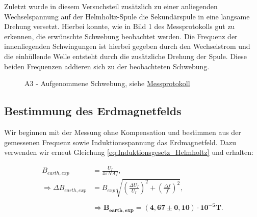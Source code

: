 \documentclass{article}
\begin{document}
Zuletzt wurde in diesem Versuchsteil zusätzlich zu einer anliegenden Wechselspannung auf der Helmholtz-Spule die Sekundärspule in eine langsame Drehung versetzt. Hierbei konnte, wie in Bild 1 des Messprotokolls gut zu erkennen, die erwünschte Schwebung beobachtet werden. Die Frequenz der innenliegenden Schwingungen ist hierbei gegeben durch den Wechselstrom und die einhüllende Welle entsteht durch die zusätzliche Drehung der Spule. Diese beiden Frequenzen addieren sich zu der beobachteten Schwebung.

\phantom{.}

\begin{figure}[!h]
    \centering
    \caption{A3 - Aufgenommene Schwebung, siehe \hyperref[page:Schwebung]{Messprotokoll}}
    \label{fig:A3-Schwebung}
\end{figure}

\newpage
\subsection{Bestimmung des Erdmagnetfelds}

Wir beginnen mit der Messung ohne Kompensation und bestimmen aus der gemessenen Frequenz sowie Induktionsspannung das Erdmagnetfeld. Dazu verwenden wir erneut Gleichung \ref{eq:Induktionsgesetz_Helmholtz} und erhalten:

\begin{equation}
    \begin{split}
        B_{earth,exp} &= \frac{U_I}{4 \pi N A f}, \\
        \Rightarrow \Delta B_{earth,exp} &= B_{exp} \sqrt{\left( \frac{\Delta U_I}{U_I} \right)^2 + \left( \frac{\Delta f}{f} \right)^2}, \\ \\
        &\Rightarrow \bm{B_{earth,exp} = (4,67 \pm 0,10)\cdot 10^{-5}} \textbf{T}.
    \end{split}
\end{equation}
\end{document}
